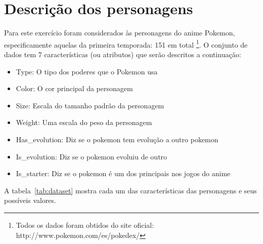 \section{Descrição dos personagens}
\label{sec:characters}

Para este exercício foram considerados às personagens do anime Pokemon, especificamente aquelas da primeira temporada: 151 em total \footnote{Todos os dados foram obtidos do site oficial: http://www.pokemon.com/es/pokedex/}. O conjunto de dados tem 7 características (ou atributos) que serão descritos a continuação:

\begin{itemize}
	\item Type: O tipo dos poderes que o Pokemon usa
	\item Color: O cor principal da personagem
	\item Size: Escala do tamanho padrão da personagem
	\item Weight: Uma escala do peso da personagem
	\item Has\_evolution: Diz se o pokemon tem evolução a outro pokemon
	\item Is\_evolution: Diz se o pokemon evoluiu de outro
	\item Is\_starter: Diz se o pokemon é um dos principais nos jogos do anime
\end{itemize}

A tabela~\ref{tab:dataset} mostra cada um das características das personagens e seus possíveis valores.

